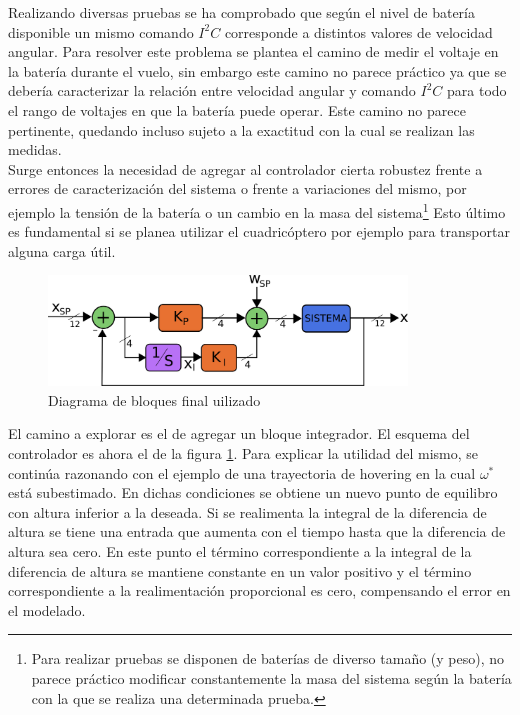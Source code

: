 \documentclass[main]{subfiles}
\begin{document}
Realizando diversas pruebas se ha comprobado que seg\'un el nivel de bater\'ia disponible un mismo comando $I^2C$ corresponde a distintos valores de velocidad angular. Para resolver este problema se plantea el camino de medir el voltaje en la bater\'ia durante el vuelo, sin embargo este camino no parece pr\'actico ya que se deber\'ia caracterizar la relaci\'on entre velocidad angular y comando $I^2C$ para todo el rango de voltajes en que la bater\'ia puede operar. Este camino no parece pertinente, quedando incluso sujeto a la exactitud con la cual se realizan las medidas.\\

Surge entonces la necesidad de agregar al controlador cierta robustez frente a errores de caracterizaci\'on del sistema o frente a variaciones del mismo, por ejemplo la tensi\'on de la bater\'ia o un cambio en la masa del sistema\footnote{Para realizar pruebas se disponen de bater\'ias de diverso tamaño (y peso), no parece pr\'actico modificar constantemente la masa del sistema seg\'un la bater\'ia con la que se realiza una determinada prueba.} Esto \'ultimo es fundamental si se planea utilizar el cuadric\'optero por ejemplo para transportar alguna carga \'util.\\

\begin{figure}[h!]
	\centering
	\vspace{-20pt}
	\includegraphics[width=0.85\textwidth]{./pics_control/diagrama_bloques_completo.png}
	\caption{Diagrama de bloques final uilizado}
	\label{fig:bloque2}
\end{figure}

El camino a explorar es el de agregar un bloque integrador. El esquema del controlador es ahora el de la figura \ref{fig:bloque2}. Para explicar la utilidad del mismo, se contin\'ua razonando con el ejemplo de una trayectoria de hovering en la cual $\omega^*$ est\'a subestimado. En dichas condiciones se obtiene un nuevo punto de equilibro con altura inferior a la deseada. Si se realimenta la integral de la diferencia de altura se tiene una entrada que aumenta con el tiempo hasta que la diferencia de altura sea cero. En este punto el t\'ermino correspondiente a la integral de la diferencia de altura se mantiene constante en un valor positivo y el t\'ermino correspondiente a la realimentaci\'on proporcional es cero, compensando el error en el modelado.\\
\end{document}
